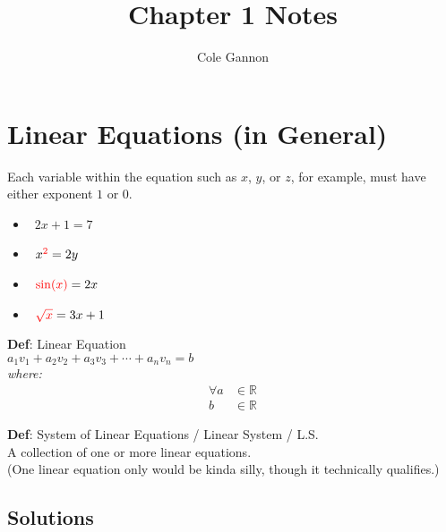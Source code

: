 \documentclass{article}
\title{Chapter 1 Notes}
\author{Cole Gannon}
\date{}
\def\chk{\ding{51}}
\def\xhk{\ding{55}}
\begin{document}
\maketitle

\section{Linear Equations (in General)}

Each variable within the equation such as $x$, $y$, or $z$, for example, must have either exponent $1$ or $0$.

\begin{itemize}
   \item \chk\ $2x+1=7$
   \item \xhk\ $x^{\textcolor{red}{2}}=2y$
   \item \xhk\ $\textcolor{red}{\sin(x)}=2x$
   \item \xhk\ $\textcolor{red}{\sqrt{x}}=3x+1$
\end{itemize}

\begin{center}
   \textbf{Def}: Linear Equation\\
   $a_1v_1+a_2v_2+a_3v_3+\cdots+a_nv_n=b$\\
   \hspace{-5em}\textit{where:}\\
   \vspace{-2em}
   \begin{align*}
      \forall a&\in\mathbb{R}\\
      b&\in\mathbb{R}
   \end{align*}

   \textbf{Def}: System of Linear Equations / Linear System / L.S.\\
   A collection of one or more linear equations.\\
   (One linear equation only would be kinda silly, though it technically qualifies.)
\end{center}

\subsection{Solutions}
\end{document}
